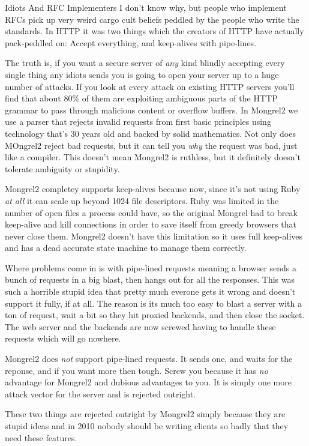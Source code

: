 \begin{aside}{Idiots And RFC Implementers}
I don't know why, but people who implement RFCs pick up very weird cargo cult
beliefs peddled by the people who write the standards.  In HTTP it was two things
which the creators of HTTP have actually pack-peddled on:  Accept everything, and 
keep-alives with pipe-lines.

The truth is, if you want a secure server of \emph{any} kind blindly accepting every 
single thing any idiots sends you is going to open your server up to a huge number
of attacks.  If you look at every attack on existing HTTP servers you'll find that 
about 80\% of them are exploiting ambiguous parts of the HTTP grammar to pass
through malicious content or overflow buffers.  In Mongrel2 we use a parser that rejects
invalid requests from first basic principles using technology that's 30 years old and
backed by solid mathematics.  Not only does MOngrel2 reject bad requests, but it can
tell you \emph{why} the request was bad, just like a compiler.  This doesn't mean
Mongrel2 is ruthless, but it definitely doesn't tolerate ambiguity or stupidity.

Mongrel2 completey supports keep-alives because now, since it's not using Ruby 
\emph{at all} it can scale up beyond 1024 file descriptors.  Ruby was limited
in the number of open files a process could have, so the original Mongrel had
to break keep-alive and kill connections in order to save itself from greedy
browsers that never close them.  Mongrel2 doesn't have this limitation so it
uses full keep-alives and has a dead accurate state machine to manage them correctly.

Where problems come in is with pipe-lined requests meaning a browser sends a bunch
of requests in a big blast, then hangs out for all the responses.  This was such a
horrible stupid idea that pretty much everone gets it wrong and doesn't support it
fully, if at all.  The reason is its much too easy to blast a server with a ton
of request, wait a bit so they hit proxied backends, and then close the socket.  The
web server and the backends are now screwed having to handle these requests which will
go nowhere.

Mongrel2 does \emph{not} support pipe-lined requests.  It sends one, and waits for the
reponse, and if you want more then tough.  Screw you because it has \emph{no} advantage
for Mongrel2 and dubious advantages to you.  It is simply one more attack vector for
the server and is rejected outright.

These two things are rejected outright by Mongrel2 simply because they are stupid ideas
and in 2010 nobody should be writing clients so badly that they need these features.
\end{aside}

